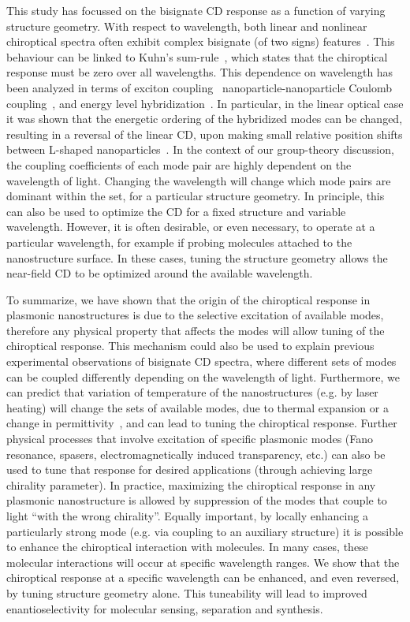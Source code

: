 This study has focussed on the bisignate CD response as a function of varying structure geometry. With respect to wavelength, both linear and nonlinear chiroptical spectra often exhibit complex bisignate (of two signs) features~\cite{Li2015, Lee2013, Decker2007, Droulias2013, Plum2009}. This behaviour can be linked to Kuhn’s sum-rule~\cite{Kuhn1930}, which states that the chiroptical response must be zero over all wavelengths. This dependence on wavelength has been analyzed in terms of exciton coupling~\cite{Guerrero-Martinez2011} nanoparticle-nanoparticle Coulomb coupling~\cite{Fan2010}, and energy level hybridization~\cite{Auguie2011a}.
In particular, in the linear optical case it was shown that the energetic ordering of the hybridized modes can be changed, resulting in a reversal of the linear CD, upon making small relative position shifts between L-shaped nanoparticles~\cite{Hentschel2015}.
In the context of our group-theory discussion, the coupling coefficients of each mode pair are highly dependent on the wavelength of light. Changing the wavelength will change which mode pairs are dominant within the set, for a particular structure geometry. In principle, this can also be used to optimize the CD for a fixed structure and variable wavelength. However, it is often desirable, or even necessary, to operate at a particular wavelength, for example if probing molecules attached to the nanostructure surface. In these cases, tuning the structure geometry allows the near-field CD to be optimized around the available wavelength.

To summarize, we have shown that the origin of the chiroptical response in plasmonic nanostructures is due to the selective excitation of available modes, therefore any physical property that affects the modes will allow tuning of the chiroptical response. This mechanism could also be used to explain previous experimental observations of bisignate CD spectra, where different sets of modes can be coupled differently depending on the wavelength of light. Furthermore, we can predict that variation of temperature of the nanostructures (e.g. by laser heating) will change the sets of available modes, due to thermal expansion or a change in permittivity~\cite{Aksyutov1977}, and can lead to tuning the chiroptical response. Further physical processes that involve excitation of specific plasmonic modes (Fano resonance, spasers, electromagnetically induced transparency, etc.) can also be used to tune that response for desired applications (through achieving large chirality parameter). 
In practice, maximizing the chiroptical response in any plasmonic nanostructure is allowed by suppression of the modes that couple to light ``with the wrong chirality''. Equally important, by locally enhancing a particularly strong mode (e.g. via coupling to an auxiliary structure) it is possible to enhance the chiroptical interaction with molecules. In many cases, these molecular interactions will occur at specific wavelength ranges. We show that the chiroptical response at a specific wavelength can be enhanced, and even reversed, by tuning structure geometry alone. This tuneability will lead to improved enantioselectivity for molecular sensing, separation and synthesis.
